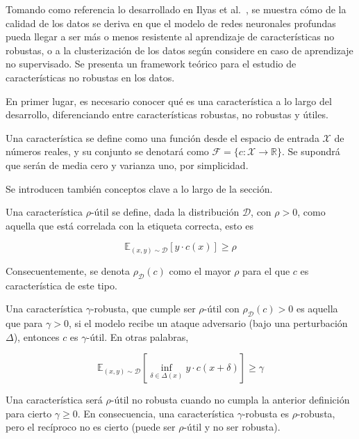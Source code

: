 Tomando como referencia lo desarrollado en Ilyas et al.~\cite{NoRobustFeatures}, se muestra cómo de la calidad de los datos se deriva en que el modelo de redes neuronales profundas pueda llegar a ser más o menos resistente al aprendizaje de características no robustas, o a la clusterización de los datos según considere en caso de aprendizaje no supervisado. Se presenta un framework teórico para el estudio de características no robustas en los datos.

En primer lugar, es necesario conocer qué es una característica a lo largo del desarrollo, diferenciando entre características robustas, no robustas y útiles.

\begin{definicion}
Una característica se define como una función desde el espacio de entrada $\mathcal{X}$ de números reales, y su conjunto se denotará como $\mathcal{F} = \{c: \mathcal{X} \to \mathbb{R}\}$. Se supondrá que serán de media cero y varianza uno, por simplicidad.
\end{definicion}

Se introducen también conceptos clave a lo largo de la sección.

\begin{definicion}
Una característica $\rho$-útil se define, dada la distribución $\mathcal{D}$, con $\rho > 0$, como aquella que está correlada con la etiqueta correcta, esto es 

$$\mathbb{E}_{(x,y)\sim \mathcal{D}}\left[ y \cdot c(x) \right] \geq \rho$$

Consecuentemente, se denota $\rho_{\mathcal{D}}(c)$ como el mayor $\rho$ para el que $c$ es característica de este tipo.
\end{definicion}
\begin{definicion}
Una característica $\gamma$-robusta, que cumple ser $\rho$-útil con $\rho_{\mathcal{D}}(c)>0$ es aquella que para $\gamma>0$, si el modelo recibe un ataque adversario (bajo una perturbación $\Delta$), entonces $c$ es $\gamma$-útil. En otras palabras,

$$\mathbb{E}_{(x,y)\sim \mathcal{D}} \left[ \inf_{\delta \in \Delta(x)} y \cdot c(x+\delta) \right] \geq \gamma$$
\end{definicion}

Una característica será $\rho$-útil no robusta cuando no cumpla la anterior definición para cierto $\gamma \geq 0$. En consecuencia, una característica $\gamma$-robusta es $\rho$-robusta, pero el recíproco no es cierto (puede ser $\rho$-útil y no ser robusta).

